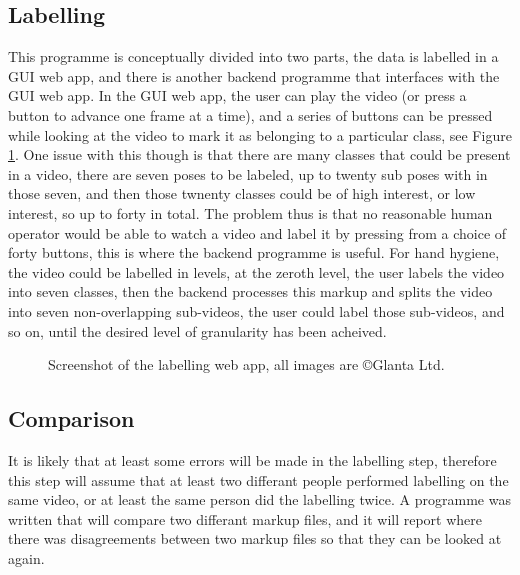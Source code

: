     \subsection{Labelling}
    This programme is conceptually divided into two parts, the data is labelled in a GUI web app, and there is another backend programme that interfaces with the GUI web app. In the GUI web app, the user can play the video (or press a button to advance one frame at a time), and a series of buttons can be pressed while looking at the video to mark it as belonging to a particular class, see Figure \ref{fig:markupscreenshot}. One issue with this though is that there are many classes that could be present in a video, there are seven poses to be labeled, up to twenty sub poses with in those seven, and then those twnenty classes could be of high interest, or low interest, so up to forty in total. The problem thus is that no reasonable human operator would be able to watch a video and label it by pressing from a choice of forty buttons, this is where the backend programme is useful. For hand hygiene, the video could be labelled in levels, at the zeroth level, the user labels the video into seven classes, then the backend processes this markup and splits the video into seven non-overlapping sub-videos,  the user could label those sub-videos, and so on, until the desired level of granularity has been acheived.
    \begin{figure}[h]
        \centering
        \caption{Screenshot of the labelling web app, all images are \copyright \space Glanta Ltd.}
        \label{fig:markupscreenshot}
    \end{figure}

    \subsection{Comparison} 
    It is likely that at least some errors will be made in the labelling step, therefore this step will assume that at least two differant people performed labelling on the same video, or at least the same person did the labelling twice. A programme was written that will compare two differant markup files, and it will report where there was disagreements between two markup files so that they can be looked at again.

